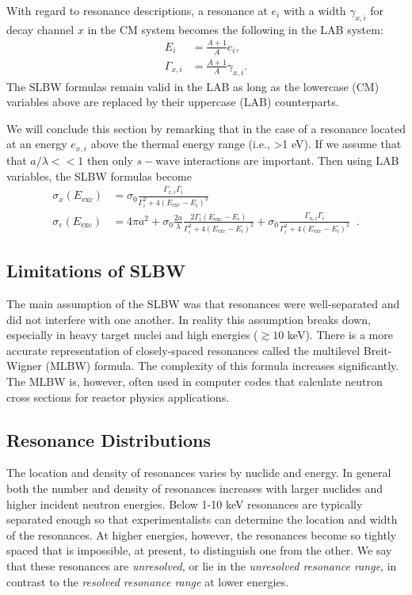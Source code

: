 \documentclass[11pt]{article}
\begin{document}
With regard to resonance descriptions, a resonance at \(e_i\) with a width \(\gamma_{x,i}\) for decay channel \(x\) in the CM system becomes the following in the LAB system:
\begin{align}
  E_i &= \frac{A+1}{A} e_i, \\
  \Gamma_{x,i} &= \frac{A+1}{A} \gamma_{x,i}.
\end{align}
The SLBW formulas remain valid in the LAB as long as the lowercase (CM) variables above are replaced by their uppercase (LAB) counterparts.

We will conclude this section by remarking that in the case of a resonance located at an energy \(e_{x,i}\) above the thermal energy range (i.e., >1 eV).  If we assume that that \(a/\lambda << 1\) then only \(s-\text{wave}\) interactions are important.  Then using LAB variables, the SLBW formulas become
\begin{align}
  \label{eq::simpleSLBW1}
  \sigma_x(E_\text{exc}) &=  \sigma_0 \frac{\Gamma_{x,i} \Gamma_i}{\Gamma_i^2 + 4\left(E_\text{exc} - E_i\right)^2} \\
  \label{eq::simpleSLBW2}
  \sigma_e(E_\text{exc}) &= 4\pi a^2 
         + \sigma_0 \frac{2a}{\lambda} \frac{2\Gamma_i\left(E_\text{exc} - E_i\right)}{\Gamma_i^2 + 4\left(E_\text{exc} - E_i\right)^2}
         + \sigma_0 \frac{\Gamma_{n,i} \Gamma_i}{\Gamma_i^2 + 4\left(E_\text{exc} - E_i\right)^2} \;\;.
\end{align}

\subsection{Limitations of SLBW}
\label{sec:orgheadline3}
The main assumption of the SLBW was that resonances were well-separated and did not interfere with one another.  In reality this assumption breaks down, especially in heavy target nuclei and high energies (\(\gtrsim 10\) keV).  There is a more accurate representation of closely-spaced resonances called the multilevel Breit-Wigner (MLBW) formula.  The complexity of this formula increases significantly.  The MLBW is, however, often used in computer codes that calculate neutron cross sections for reactor physics applications.

\subsection{Resonance Distributions}
\label{sec:orgheadline4}
The location and density of resonances varies by nuclide and energy.  In general both the number and density of resonances increases with larger nuclides and higher incident neutron energies.  Below 1-10 keV resonances are typically separated enough so that experimentalists can determine the location and width of the resonances. At higher energies, however, the resonances become so tightly spaced that is impossible, at present, to distinguish one from the other.  We say that these resonances are \emph{unresolved}, or lie in the \emph{unresolved resonance range}, in contrast to the \emph{resolved resonance range} at lower energies.
\end{document}
